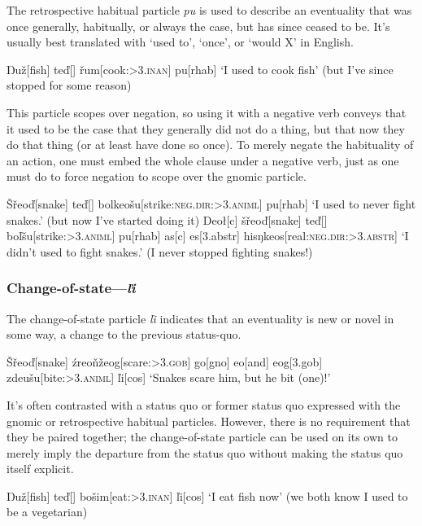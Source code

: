 \documentclass[10pt]{article}
\newcommand{\sk}{\textsc}
\newcommand{\vd}{ď}
\newcommand{\vz}{ž}
\newcommand{\vs}{š}
\newcommand{\vr}{ř}
\newcommand{\vl}{ľ}
\newcommand{\vn}{ň}
\newcommand{\vS}{Š}
\newcommand{\Engma}{Ŋ}
\newcommand{\engma}{ŋ}
\begin{document}
The retrospective habitual particle \textit{pu} is used to describe an eventuality that was once generally, habitually, or always the case, but has since ceased to be. It's usually best translated with `used to', `once', or `would X' in English.

\ex 
\begingl
\Engma u\vz[fish]
te\vd[]
\vr um[cook:\sk{>3.inan}]
pu[\sc rhab]
\glft `I used to cook fish' (but I've since stopped for some reason)
\endgl
\xe

This particle scopes over negation, so using it with a negative verb conveys that it used to be the case that they generally did not do a thing, but that now they do that thing (or at least have done so once). To merely negate the habituality of an action, one must embed the whole clause under a negative verb, just as one must do to force negation to scope over the gnomic particle.

\pex 
\a
\begingl 
\vS\vr eo\vd[snake]
te\vd[]
bolkeo\vs u[strike:\sk{neg.dir:>3.animl}]
pu[\sc rhab]
\glft `I used to never fight snakes.' (but now I've started doing it)
\endgl 
\a
\begingl
Deo\l[\sc c]
\vs\vr eo\vd[snake]
te\vd[]
bo\vl\vs u[strike:\sk{>3.animl}]
pu[\sc rhab]
\nogloss{,}
as[\sc c]
es[\sc 3.abstr]
his\engma keos[real:\sk{neg.dir:>3.abstr}]
\glft `I didn't used to fight snakes.' (I never stopped fighting snakes!)
\endgl 
\xe

\subsubsection{Change-of-state---\textit{\vl i}}

The change-of-state particle \textit{\vl i} indicates that an eventuality is new or novel in some way, a change to the previous status-quo. 

\ex
\begingl
\vS\vr eo\vd[snake]
\'zreo\vn\vz eog[scare:\sk{>3.gob}]
go[\sc gno]
eo[and]
eog[\sc 3.gob]
zdeu\vs u[bite:\sk{>3.animl}]
\vl i[\sc cos]
\glft `Snakes scare him, but he bit (one)!'
\endgl
\xe

It's often contrasted with a status quo or former status quo expressed with the gnomic or retrospective habitual particles. However, there is no requirement that they be paired together; the change-of-state particle can be used on its own to merely imply the departure from the status quo without making the status quo itself explicit.

\ex
\begingl
\Engma u\vz[fish]
te\vd[]
bo\vs im[eat:\sk{>3.inan}]
\vl i[\sc cos]
\glft `I eat fish now' (we both know I used to be a vegetarian)
\endgl
\xe
\end{document}

